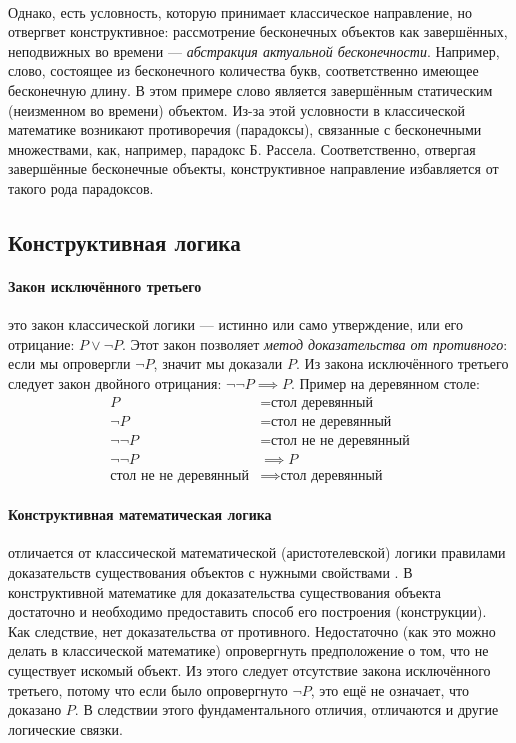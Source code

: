 \documentclass[a4paper,12pt,russian]{article}
\begin{document}
\paragraph{}Однако, есть условность, которую принимает классическое направление, но отвергвет конструктивное: рассмотрение бесконечных объектов как завершённых, неподвижных во времени --- \emph{абстракция актуальной бесконечности}. Например, слово, состоящее из бесконечного количества букв, соответственно имеющее бесконечную длину. В этом примере слово является завершённым статическим (неизменном во времени) объектом. Из-за этой условности в классической математике возникают противоречия (парадоксы), связанные с бесконечными множествами, как, например, парадокс Б. Рассела. Соответственно, отвергая завершённые бесконечные объекты, конструктивное направление избавляется от такого рода парадоксов.

\subsection{Конструктивная логика}
\paragraph{Закон исключённого третьего} это закон классической логики --- истинно или само утверждение, или его отрицание: $P \lor \neg P$. Этот закон позволяет \emph{метод доказательства от противного}: если мы опровергли $\neg P$, значит мы доказали $P$. Из закона исключённого третьего следует закон двойного отрицания: $\neg \neg P \implies P$. Пример на деревянном столе:
\begin{align*}
  P &= \text{стол деревянный}\\
  \neg P &= \text{стол не деревянный}\\
  \neg \neg P &= \text{стол не не деревянный}\\
  \neg \neg P &\implies P\\
  \text{стол не не деревянный} &\implies \text{стол деревянный}
\end{align*}
\paragraph{Конструктивная математическая логика} отличается от классической математической (аристотелевской) логики правилами доказательств существования объектов с нужными свойствами \cite[стр. 9]{markov_con}. В конструктивной математике для доказательства существования объекта достаточно и необходимо предоставить способ его построения (конструкции). Как следствие, нет доказательства от противного. Недостаточно (как это можно делать в классической математике) опровергнуть предположение о том, что не существует искомый объект. Из этого следует отсутствие закона исключённого третьего, потому что если было опровергнуто $\neg P$, это ещё не означает, что доказано $P$. В следствии этого фундаментального отличия, отличаются и другие логические связки. \cite[О логике конструктивной математики, параграф 6]{markov} \cite[стр. 9]{markov_con}
\end{document}
